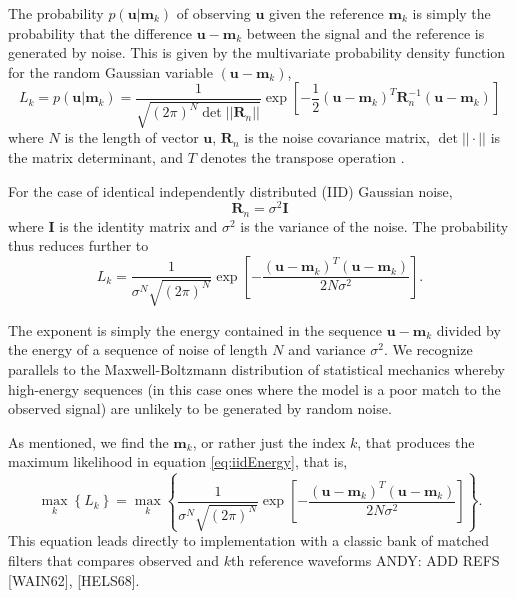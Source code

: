 The probability $p(\mathbf{u}|\mathbf{m}_k)$ of observing $\mathbf{u}$ given the reference $\mathbf{m}_k$ is simply the probability that the difference $\mathbf{u}-\mathbf{m}_k$ between the signal and the reference is generated by noise. This is given by the multivariate probability density function for the random Gaussian variable $(\mathbf{u}-\mathbf{m}_k)$, 
\begin{equation}\label{eq:Main}
L_k = p(\mathbf{u}|\mathbf{m}_k) = \frac{1}{  \sqrt{ (2\pi)^N \det || \mathbf{R}_n||} } \exp\left[ -\frac{1}{2}  (\mathbf{u}-\mathbf{m}_k)^T \mathbf{R}_n^{-1} (\mathbf{u}-\mathbf{m}_k) \right]
\end{equation}
where $N$ is the length of vector $\mathbf{u}$, $\mathbf{R}_n$ is the noise covariance matrix, $\det||{\cdot}||$ is the matrix determinant, and $T$ denotes the transpose operation  \citep{helstrom_statistical_1968, wainstein_extraction_1962}.

For the case of identical independently distributed (IID) Gaussian noise, 
\begin{equation}
\mathbf{R}_n=\sigma^2 \mathbf{I}
\end{equation}
where $\mathbf{I}$ is the identity matrix and $\sigma^2$ is the variance of the noise. The probability thus reduces further to
\begin{equation}\label{eq:iidEnergy}
L_k = \frac{1}{  \sigma^N \sqrt{ (2\pi)^N}   } \exp\left[ -\frac{(\mathbf{u}-\mathbf{m}_k)^T(\mathbf{u}-\mathbf{m}_k)} {2 N \sigma^2 } \right].
\end{equation}

The exponent is simply the energy contained in the sequence $\mathbf{u}-\mathbf{m}_k$ divided by the
energy of a sequence of noise of length $N$ and variance $\sigma^2$. We recognize parallels to the Maxwell-Boltzmann distribution of statistical mechanics \citep{reif_fundamentals_1965} whereby high-energy sequences (in this case ones where the model is a poor match to the observed signal) are unlikely to be generated by random noise.  

As mentioned, we find the $\mathbf{m}_k$, or rather just the index $k$, that produces the maximum likelihood in equation \ref{eq:iidEnergy}, that is,
\begin{equation}
\max_k   \left\{ L_k \right\} =  \max_k  \left\{ \frac{1}{   \sigma^N\sqrt{ (2\pi)^N}  } \exp\left[ -\frac{(\mathbf{u}-\mathbf{m}_k)^T(\mathbf{u}-\mathbf{m}_k)} {2 N \sigma^2 } \right] \right\}. 
\end{equation}
This equation leads directly to implementation with a classic bank of matched filters that compares observed and $k$th reference waveforms ANDY:  ADD REFS [WAIN62], [HELS68]. 

